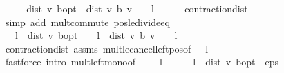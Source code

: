 \begin{isabellebody}
%
\isadelimproof
%
\endisadelimproof
%
\isatagproof
{}\isamarkupfalse%
\ {\isacharminus}{\kern0pt}\isanewline
\ \ \isamarkupfalse%
\ {\isachardoublequoteopen}dist\ v\ {\isasymnu}\isactrlsub b{\isacharunderscore}{\kern0pt}opt\ {\isasymle}\ dist\ v\ {\isacharparenleft}{\kern0pt}{\isasymL}\isactrlsub b\ v{\isacharparenright}{\kern0pt}\ {\isacharslash}{\kern0pt}\ {\isacharparenleft}{\kern0pt}{}\ {\isacharminus}{\kern0pt}\ l{\isacharparenright}{\kern0pt}{\isachardoublequoteclose}\isanewline
\ \ \ \ \isamarkupfalse%
\ contraction{\isacharunderscore}{\kern0pt}{\isasymL}{\isacharunderscore}{\kern0pt}dist\isanewline
\ \ \ \ \isamarkupfalse%
\ {\isacharparenleft}{\kern0pt}simp\ add{\isacharcolon}{\kern0pt}\ mult{\isachardot}{\kern0pt}commute\ pos{\isacharunderscore}{\kern0pt}le{\isacharunderscore}{\kern0pt}divide{\isacharunderscore}{\kern0pt}eq{\isacharparenright}{\kern0pt}\isanewline
\ \ \isamarkupfalse%
\ {\isachardoublequoteopen}{}\ {\isacharasterisk}{\kern0pt}\ l\ {\isacharasterisk}{\kern0pt}\ dist\ v\ {\isasymnu}\isactrlsub b{\isacharunderscore}{\kern0pt}opt\ {\isasymle}\ {}\ {\isacharasterisk}{\kern0pt}\ l\ {\isacharasterisk}{\kern0pt}\ {\isacharparenleft}{\kern0pt}dist\ v\ {\isacharparenleft}{\kern0pt}{\isasymL}\isactrlsub b\ v{\isacharparenright}{\kern0pt}\ {\isacharslash}{\kern0pt}\ {\isacharparenleft}{\kern0pt}{}\ {\isacharminus}{\kern0pt}\ l{\isacharparenright}{\kern0pt}{\isacharparenright}{\kern0pt}{\isachardoublequoteclose}\isanewline
\ \ \ \ \isamarkupfalse%
\ contraction{\isacharunderscore}{\kern0pt}{\isasymL}{\isacharunderscore}{\kern0pt}dist\ assms\ mult{\isacharunderscore}{\kern0pt}le{\isacharunderscore}{\kern0pt}cancel{\isacharunderscore}{\kern0pt}left{\isacharunderscore}{\kern0pt}pos{\isacharbrackleft}{\kern0pt}of\ {\isachardoublequoteopen}{}\ {\isacharasterisk}{\kern0pt}\ l{\isachardoublequoteclose}{\isacharbrackright}{\kern0pt}\isanewline
\ \ \ \ \isamarkupfalse%
\ {\isacharparenleft}{\kern0pt}fastforce\ intro{\isacharbang}{\kern0pt}{\isacharcolon}{\kern0pt}\ mult{\isacharunderscore}{\kern0pt}left{\isacharunderscore}{\kern0pt}mono{\isacharbrackleft}{\kern0pt}of\ {\isacharunderscore}{\kern0pt}\ {\isacharunderscore}{\kern0pt}\ {\isachardoublequoteopen}{}\ {\isacharasterisk}{\kern0pt}\ l{\isachardoublequoteclose}{\isacharbrackright}{\kern0pt}{\isacharparenright}{\kern0pt}\isanewline
\ \ \isamarkupfalse%
\ {\isachardoublequoteopen}{}\ {\isacharasterisk}{\kern0pt}\ l\ {\isacharasterisk}{\kern0pt}\ dist\ v\ {\isasymnu}\isactrlsub b{\isacharunderscore}{\kern0pt}opt\ {\isacharless}{\kern0pt}\ eps{\isachardoublequoteclose}\isanewline

\end{isabellebody}
